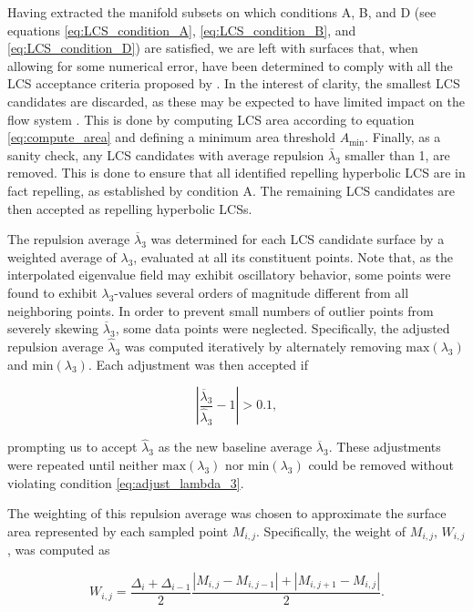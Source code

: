 Having extracted the manifold subsets on which conditions A, B, and D (see equations \eqref{eq:LCS_condition_A}, \eqref{eq:LCS_condition_B}, and \eqref{eq:LCS_condition_D}) are satisfied, we are left with surfaces that, when allowing for some numerical error, have been determined to comply with all the LCS acceptance criteria proposed by \cite{Haller14Errata}. In the interest of clarity, the smallest LCS candidates are discarded, as these may be expected to have limited impact on the flow system \citep{Haller12}. This is done by computing LCS area according to equation \ref{eq:compute_area} and defining a minimum area threshold $A_{\text{min}}$. Finally, as a sanity check, any LCS candidates with average repulsion $\bar{\lambda}_3$ smaller than 1, are removed. This is done to ensure that all identified repelling hyperbolic LCS are in fact repelling, as established by condition A. The remaining LCS candidates are then accepted as repelling hyperbolic LCSs.

The repulsion average $\overline{\lambda}_3$ was determined for each LCS candidate surface by a weighted average of $\lambda_3$, evaluated at all its constituent points. Note that, as the interpolated eigenvalue field may exhibit oscillatory behavior, some points were found to exhibit $\lambda_3$-values several orders of magnitude different from all neighboring points. In order to prevent small numbers of outlier points from severely skewing $\overline{\lambda}_3$, some data points were neglected. Specifically, the adjusted repulsion average $\widehat{\lambda}_3$ was computed iteratively by alternately removing $\text{max}(\lambda_3)$ and $\text{min}(\lambda_3)$. Each adjustment was then accepted if

\begin{equation}\label{eq:adjust_lambda_3}
\left| \frac{\overline{\lambda}_3}{\widehat{\lambda}_3} - 1\right| > 0.1,
\end{equation}

\noindent prompting us to accept $\widehat{\lambda}_3$ as the new baseline average $\overline{\lambda}_3$. These adjustments were repeated until neither $\text{max}(\lambda_3)$ nor $\text{min}(\lambda_3)$ could be removed without violating condition \eqref{eq:adjust_lambda_3}. 

The weighting of this repulsion average was chosen to approximate the surface area represented by each sampled point $M_{i,j}$. Specifically, the weight of $M_{i,j}$, $W_{i,j}$, was computed as 

\begin{equation}
W_{i,j} = \frac{\Delta_{i}+\Delta_{i-1}}{2}\frac{\left|M_{i,j}-M_{i,j-1}\right|+\left|M_{i,j+1}-M_{i,j}\right|}{2}.
\end{equation}

